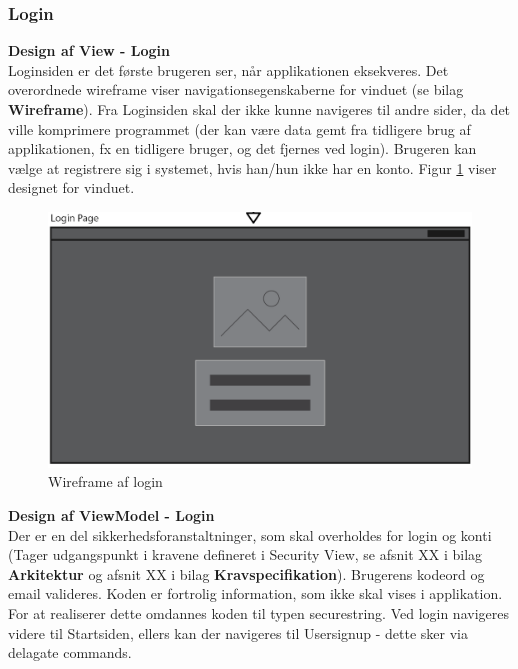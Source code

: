\documentclass[Rapport/Rapport_main.tex]{subfiles}
\begin{document}
\subsubsection{Login}
\textbf{Design af View - Login}\\
Loginsiden er det første brugeren ser, når applikationen eksekveres. Det overordnede wireframe viser navigationsegenskaberne for vinduet (se bilag \textbf{Wireframe}). Fra Loginsiden skal der ikke kunne navigeres til andre sider, da det ville komprimere programmet (der kan være data gemt fra tidligere brug af applikationen, fx en tidligere bruger, og det fjernes ved login). Brugeren kan vælge at registrere sig i systemet, hvis han/hun ikke har en konto. Figur \ref{fig:LoginWireframe} viser designet for vinduet. 
\begin{figure}[H]
    \centering
    \includegraphics[width=\textwidth]{SoftwareDesign/MVVMDesigns/Graphics/LoginWireframe.png}
    \caption{Wireframe af login}
    \label{fig:LoginWireframe}
\end{figure}

\textbf{Design af ViewModel - Login}\\
Der er en del sikkerhedsforanstaltninger, som skal overholdes for login og konti (Tager udgangspunkt i kravene defineret i Security View, se afsnit XX i bilag \textbf{Arkitektur} og afsnit XX i bilag \textbf{Kravspecifikation}). Brugerens kodeord og email valideres. Koden er fortrolig information, som ikke skal vises i applikation. For at realiserer dette omdannes koden til typen securestring\cite{securestring}. Ved login navigeres videre til Startsiden, ellers kan der navigeres til Usersignup - dette sker via delagate commands. 
\end{document}
